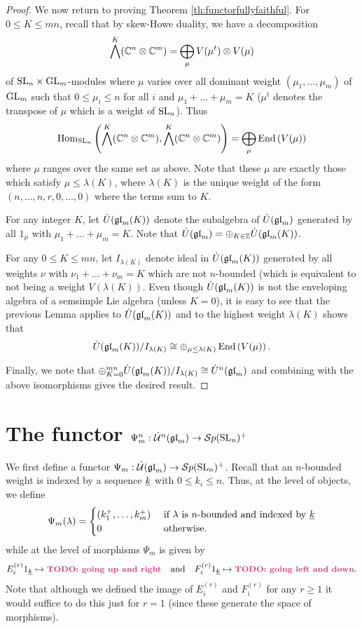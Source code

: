 \documentclass[10pt,leqno]{article}
\begin{document}
\begin{proof}
We now return to proving Theorem \ref{th:functorfullyfaithful}. For $ 0 \le K \le mn $, recall that by skew-Howe duality, we have a decomposition 
$$ \bigwedge^K (\mathbb C^n \otimes \mathbb C^m) = \bigoplus_{\mu} V(\mu^t) \otimes V(\mu) $$
of ${\rm{SL}}_n \times {\rm{GL}}_m$-modules where $\mu$ varies over all dominant weight $(\mu_1, \dots, \mu_m) $ of ${\rm{GL}}_m$ such that $ 0 \le \mu_i \le n $ for all $i$  and $ \mu_1 + \dots + \mu_m = K$ ($\mu^t$ denotes the transpose of $\mu$ which is a weight of ${\rm{SL}}_n$). Thus 
$$ \operatorname{Hom}_{{\rm{SL}}_n} \left(\bigwedge^K(\mathbb C^n \otimes \mathbb C^m), \bigwedge^K(\mathbb C^n \otimes \mathbb C^m)\right) = \bigoplus_{\mu} \operatorname{End}\left(V(\mu)\right) $$
where $ \mu $ ranges over the same set as above.  Note that these $\mu $ are exactly those which satisfy $ \mu \le \lambda(K) $, where $ \lambda(K) $ is the unique weight of the form $(n, \dots, n, r, 0, \dots, 0) $ where the terms sum to $K$. 

For any integer $K$, let $\dot{U}({\mathfrak{gl}}_m(K))$ denote the subalgebra of $\dot{U}({\mathfrak{gl}}_m)$ generated by all $ 1_\mu $ with $ \mu_1 + \dots + \mu_m = K $.  Note that $\dot{U}({\mathfrak{gl}}_m) = \oplus_{K \in \mathbb Z} \dot{U}({\mathfrak{gl}}_m(K))$. 

For any $ 0 \le K \le mn $, let $ I_{\lambda(K)} $ denote ideal in $\dot{U}({\mathfrak{gl}}_m(K))$ generated by all weights $ \nu $ with $ \nu_1 + \dots + \nu_m = K $ which are not $ n$-bounded (which is equivalent to not being a weight $ V(\lambda(K)) $. Even though ${\dot U}({\mathfrak{gl}}_m(K))$ is not the enveloping algebra of a semsimple Lie algebra (unless $ K = 0 $), it is easy to see that the previous Lemma applies to ${\dot{U}}({\mathfrak{gl}}_m(K))$ and to the highest weight $\lambda(K)$ shows that
$${\dot U}({\mathfrak{gl}}_m(K)) / I_{\lambda(K)} \cong \oplus_{\mu \le \lambda(K)} \operatorname{End}\left(V(\mu)\right).$$

Finally, we note that $\oplus_{K=0}^{mn} {\dot{U}}({\mathfrak{gl}}_m(K)) / I_{\lambda(K)} \cong \dot{U}^n({\mathfrak{gl}}_m)$ and combining with the above isomorphisms gives the desired result.
\end{proof} 

\section{The functor $\Psi_m^n: \dot{{\mathcal{U}}}^n({\mathfrak{gl}}_m) \rightarrow {\mathcal{S}p}({\rm{SL}}_n)^+$}\label{sec:psi}

We first define a functor $\Psi_m: \dot{{\mathcal{U}}}({\mathfrak{gl}}_m) \rightarrow {\mathcal{S}p}({\rm{SL}}_n)^+$. Recall that an $n$-bounded weight is indexed by a sequence ${\underline{k}}$ with $0 \le k_i \le n$. Thus, at the level of objects, we define
$$\Psi_m(\lambda) = 
\begin{cases}
(k_1^+, \dots, k_m^+) & \text{ if } \lambda \text{ is } n \text{-bounded and indexed by } {\underline{k}} \\ 
0 & \text{ otherwise.}
\end{cases}$$
while at the level of morphisms $\Psi_m$ is given by 
$$E_i^{(r)} \one_{\ul{k}} \mapsto \todo{going up and right}  \ \ \text{ and }  \ \ F_i^{(r)} \one_{\ul{k}} \mapsto \todo{going left and down}.$$
Note that although we defined the image of $E_i^{(r)}$ and $F_i^{(r)}$ for any $r \ge 1$ it would suffice to do this just for $r=1$ (since these generate the space of morphisms). 
\end{document}

